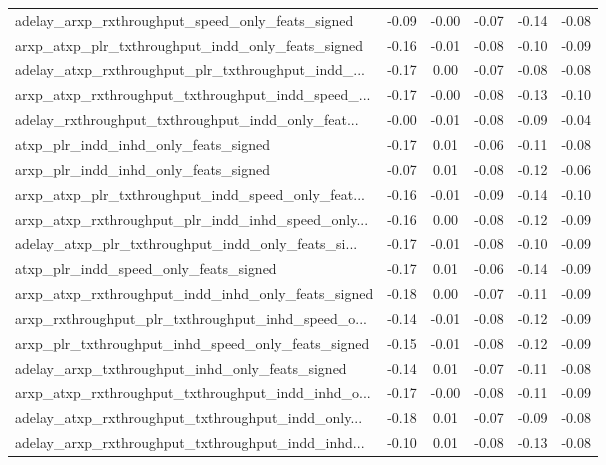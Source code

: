 \begin{tabular}{|l|*{4}{c}|r|}
adelay\_arxp\_rxthroughput\_speed\_only\_feats\_signed   & -0.09 & -0.00 &   -0.07 &      -0.14 & -0.08 \\
arxp\_atxp\_plr\_txthroughput\_indd\_only\_feats\_signed  & -0.16 & -0.01 &   -0.08 &      -0.10 & -0.09 \\
adelay\_atxp\_rxthroughput\_plr\_txthroughput\_indd\_... & -0.17 &  0.00 &   -0.07 &      -0.08 & -0.08 \\
arxp\_atxp\_rxthroughput\_txthroughput\_indd\_speed\_... & -0.17 & -0.00 &   -0.08 &      -0.13 & -0.10 \\
adelay\_rxthroughput\_txthroughput\_indd\_only\_feat... & -0.00 & -0.01 &   -0.08 &      -0.09 & -0.04 \\
atxp\_plr\_indd\_inhd\_only\_feats\_signed               & -0.17 &  0.01 &   -0.06 &      -0.11 & -0.08 \\
arxp\_plr\_indd\_inhd\_only\_feats\_signed               & -0.07 &  0.01 &   -0.08 &      -0.12 & -0.06 \\
arxp\_atxp\_plr\_txthroughput\_indd\_speed\_only\_feat... & -0.16 & -0.01 &   -0.09 &      -0.14 & -0.10 \\
arxp\_atxp\_rxthroughput\_plr\_indd\_inhd\_speed\_only... & -0.16 &  0.00 &   -0.08 &      -0.12 & -0.09 \\
adelay\_atxp\_plr\_txthroughput\_indd\_only\_feats\_si... & -0.17 & -0.01 &   -0.08 &      -0.10 & -0.09 \\
atxp\_plr\_indd\_speed\_only\_feats\_signed              & -0.17 &  0.01 &   -0.06 &      -0.14 & -0.09 \\
arxp\_atxp\_rxthroughput\_indd\_inhd\_only\_feats\_signed & -0.18 &  0.00 &   -0.07 &      -0.11 & -0.09 \\
arxp\_rxthroughput\_plr\_txthroughput\_inhd\_speed\_o... & -0.14 & -0.01 &   -0.08 &      -0.12 & -0.09 \\
arxp\_plr\_txthroughput\_inhd\_speed\_only\_feats\_signed & -0.15 & -0.01 &   -0.08 &      -0.12 & -0.09 \\
adelay\_arxp\_txthroughput\_inhd\_only\_feats\_signed    & -0.14 &  0.01 &   -0.07 &      -0.11 & -0.08 \\
arxp\_atxp\_rxthroughput\_txthroughput\_indd\_inhd\_o... & -0.17 & -0.00 &   -0.08 &      -0.11 & -0.09 \\
adelay\_atxp\_rxthroughput\_txthroughput\_indd\_only... & -0.18 &  0.01 &   -0.07 &      -0.09 & -0.08 \\
adelay\_arxp\_rxthroughput\_txthroughput\_indd\_inhd... & -0.10 &  0.01 &   -0.08 &      -0.13 & -0.08 \\

\end{tabular}
